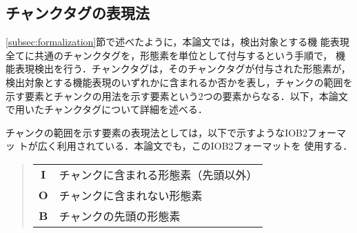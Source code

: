 \documentclass[japanese]{jnlp_1.2d}
\begin{document}
\subsection{チャンクタグの表現法}

\ref{subsec:formalization}節で述べたように，本論文では，検出対象とする機
能表現全てに共通のチャンクタグを，形態素を単位として付与するという手順で，
機能表現検出を行う．チャンクタグは，そのチャンクタグが付与された形態素が，
検出対象とする機能表現のいずれかに含まれるか否かを表し，チャンクの範囲を
示す要素とチャンクの用法を示す要素という2つの要素からなる．以下，本論文
で用いたチャンクタグについて詳細を述べる．

チャンクの範囲を示す要素の表現法としては，以下で示すようなIOB2フォーマッ
ト\cite{Sang00a}が広く利用されている．本論文でも，このIOB2フォーマットを
使用する．
\begin{quote}
  \begin{tabular}{cl}
    \textbf{I} & チャンクに含まれる形態素（先頭以外） \\
    \textbf{O} & チャンクに含まれない形態素 \\
    \textbf{B} & チャンクの先頭の形態素 \\
  \end{tabular}
\end{quote}
\end{document}
